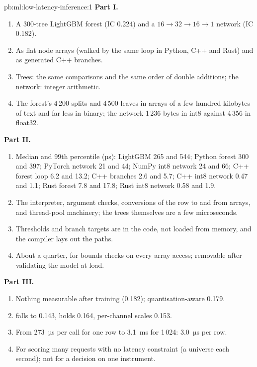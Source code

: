\begin{solution}{pb:ml:low-latency-inference:1}
\textbf{Part I.}
\begin{enumerate}
\item A 300-tree LightGBM forest (IC 0.224) and a $16\to32\to16\to1$ network (IC 0.182).
\item As flat node arrays (walked by the same loop in Python, C++ and Rust) and as generated C++ branches.
\item Trees: the same comparisons and the same order of double additions; the network: integer arithmetic.
\item The forest's 4\,200 splits and 4\,500 leaves in arrays of a few hundred kilobytes of text and far less in binary; the
network 1\,236 bytes in int8 against 4\,356 in float32.
\end{enumerate}
\textbf{Part II.}
\begin{enumerate}[resume]
\item Median and 99th percentile (µs): LightGBM 265 and 544; Python forest 300 and 397; PyTorch network 21 and 44; NumPy int8
network 24 and 66; C++ forest loop 6.2 and 13.2; C++ branches 2.6 and 5.7; C++ int8 network 0.47 and 1.1; Rust forest 7.8
and 17.8; Rust int8 network 0.58 and 1.9.
\item The interpreter, argument checks, conversions of the row to and from arrays, and thread-pool machinery; the trees
themselves are a few microseconds.
\item Thresholds and branch targets are in the code, not loaded from memory, and the compiler lays out the paths.
\item About a quarter, for bounds checks on every array access; removable after validating the model at load.
\end{enumerate}
\textbf{Part III.}
\begin{enumerate}[resume]
\item Nothing measurable after training (0.182); quantisation-aware  0.179.
\item {} falls to 0.143,  holds 0.164, per-channel scales 0.153.
\item From 273~µs per call for one row to 3.1~ms for 1\,024: 3.0~µs per row.
\item For scoring many requests with no latency constraint (a universe each second); not for a decision on one instrument.

\end{enumerate}
\end{solution}
